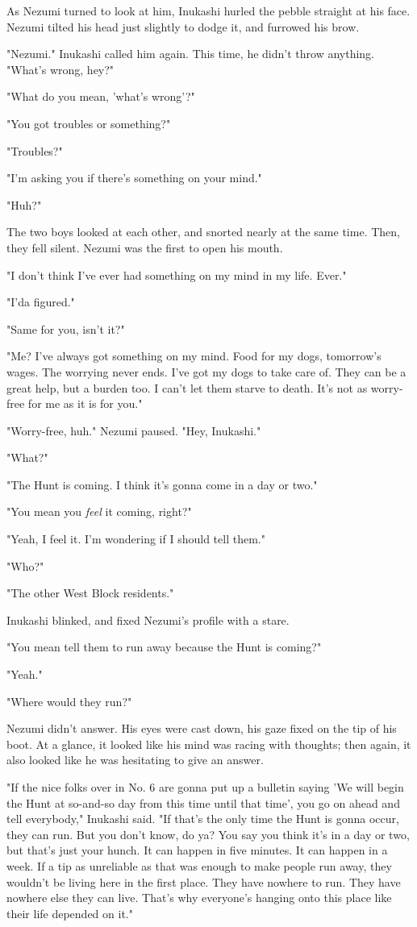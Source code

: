 As Nezumi turned to look at him, Inukashi hurled the pebble straight at
his face. Nezumi tilted his head just slightly to dodge it, and furrowed
his brow.

"Nezumi." Inukashi called him again. This time, he didn't throw
anything. "What's wrong, hey?"

"What do you mean, 'what's wrong'?"

"You got troubles or something?"

"Troubles?"

"I'm asking you if there's something on your mind."

"Huh?"

The two boys looked at each other, and snorted nearly at the same time.
Then, they fell silent. Nezumi was the first to open his mouth.

"I don't think I've ever had something on my mind in my life. Ever."

"I'da figured."

"Same for you, isn't it?"

"Me? I've always got something on my mind. Food for my dogs, tomorrow's
wages. The worrying never ends. I've got my dogs to take care of. They
can be a great help, but a burden too. I can't let them starve to death.
It's not as worry-free for me as it is for you."

"Worry-free, huh." Nezumi paused. "Hey, Inukashi."

"What?"

"The Hunt is coming. I think it's gonna come in a day or two."

"You mean you \emph{feel} it coming, right?"

"Yeah, I feel it. I'm wondering if I should tell them."

"Who?"

"The other West Block residents."

Inukashi blinked, and fixed Nezumi's profile with a stare.

"You mean tell them to run away because the Hunt is coming?"

"Yeah."

"Where would they run?"

Nezumi didn't answer. His eyes were cast down, his gaze fixed on the tip
of his boot. At a glance, it looked like his mind was racing with
thoughts; then again, it also looked like he was hesitating to give an
answer.

"If the nice folks over in No. 6 are gonna put up a bulletin saying 'We
will begin the Hunt at so-and-so day from this time until that time',
you go on ahead and tell everybody," Inukashi said. "If that's the only
time the Hunt is gonna occur, they can run. But you don't know, do ya?
You say you think it's in a day or two, but that's just your hunch. It
can happen in five minutes. It can happen in a week. If a tip as
unreliable as that was enough to make people run away, they wouldn't be
living here in the first place. They have nowhere to run. They have
nowhere else they can live. That's why everyone's hanging onto this
place like their life depended on it."


